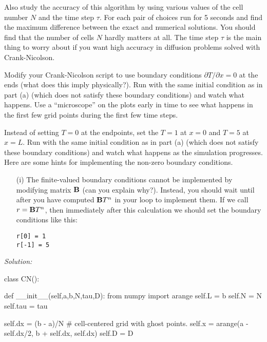 {\begin{enumerate}
\begin{enumerate}
\subprob    Also study the accuracy of this algorithm by using
    various values of the cell number $N$ and the time
    step $\tau$. For each pair of choices run for 5
    seconds and find the maximum difference between the
    exact and numerical solutions. You should find that
    the number of cells $N$ hardly matters at all. The
    time step $\tau$ is the main thing to worry
    about if you want high accuracy in diffusion
    problems solved with Crank-Nicolson.


\subprob \label{P:18.3b} Modify your Crank-Nicolson
    script to use boundary conditions $\partial T /
    \partial x=0$ at the ends (what does this imply physically?). Run
    with the same initial condition as in part (a) (which does not
    satisfy these boundary conditions) and watch what happens. Use a
    ``microscope'' on the plots early in time to see what happens in
    the first few grid points during the first few time steps.


\subprob Instead of setting $T=0$ at the endpoints, set the $T = 1$ at
$x = 0$ and $T = 5$ at $x = L$.  Run with the same
    initial condition as in part (a) (which does not
    satisfy these boundary conditions) and watch what happens as the
    simulation progresses.  Here are some hints for implementing the
    non-zero boundary conditions.
\begin{enumerate}
\item[(i)]  The finite-valued boundary conditions cannot be
  implemented by modifying matrix ${\bf B}$ (can you explain why?).
  Instead, you should wait until after you have computed ${\bf B} T^n$
  in your loop to implement them.  If we call $r = {\bf B} T^n$, then
  immediately after this calculation we should set the boundary
  conditions like this:
\begin{Verbatim}
r[0] = 1
r[-1] = 5
\end{Verbatim}
\end{enumerate}
\end{enumerate}
\end{enumerate}
\ifsolutions
\textit{Solution:}\\
\begin{codeexample}
\begin{VerbatimOut}{\listingFile}


class CN():

    def __init__(self,a,b,N,tau,D):
        from numpy import arange
        self.L = b
        self.N = N
        self.tau = tau

        self.dx = (b - a)/N
        # cell-centered grid with ghost points.
        self.x = arange(a - self.dx/2, b + self.dx, self.dx)
        self.D = D


\end{VerbatimOut}
\end{codeexample}}
